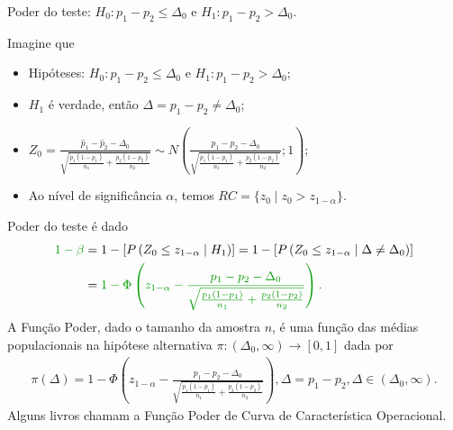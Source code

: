 \documentclass[9pt]{beamer}
\begin{document}
\begin{frame}{Poder do teste: $H_0:p_1 - p_2 \leq \Delta_0$ e $H_1: p_1 - p_2 > \Delta_0$.}

\footnotesize

Imagine que
\begin{itemize}
	\item Hipóteses: $H_0: p_1 - p_2 \leq \Delta_0$ e $H_1: p_1 -  p_2 > \Delta_0$;
	\item $H_1$ é verdade, então $\Delta = p_1-p_2 \neq \Delta_0$;
	\item $Z_0 = \frac{\hat{p}_1 - \hat{p}_2 - \Delta_0}{\sqrt{ 
			\frac{p_1(1-p_1)}{n_1} + \frac{p_2(1-p_2)}{n_2} }} \sim N\left( \frac{p_1 - p_2 - \Delta_0}{\sqrt{\frac{p_1(1-p_1)}{n_1} + \frac{p_2(1-p_2)}{n_2}}};1 \right)$;
	\item Ao nível de significância $\alpha$, temos $RC = \{ z_0 \mid z_0 > z_{1-\alpha}  \}$.
\end{itemize}
\vfill	

Poder do teste é dado
\begin{align*}
\textcolor{important}{1-\beta} &=1 - \left[P\left(  Z_0 \leq z_{1-\alpha} \mid H_1 \right)\right] = 1 - \left[P\left( Z_0 \leq z_{1-\alpha} \mid \Delta \neq \Delta_0 \right)\right]\\
&= \textcolor{important}{1 - \Phi\left( z_{1-\alpha} - \frac{p_1-p_2 - \Delta_0}{\sqrt{\frac{p_1(1-p_1)}{n_1} + \frac{p_2(1-p_2)}{n_2}}} \right).}
\end{align*}
A \textcolor{important}{Função Poder}, dado o tamanho da amostra $n$, é uma função das médias populacionais na hipótese alternativa  $\pi: (\Delta_0, \infty) \longrightarrow [0,1]$ dada por
\begin{align*}
\pi(\Delta) = 1 - \Phi\left( z_{1-\alpha} - \frac{p_1-p_2 - \Delta_0}{\sqrt{\frac{p_1(1-p_1)}{n_1} + \frac{p_2(1-p_2)}{n_2}}} \right), \Delta = p_1 - p_2, \Delta \in (\Delta_0, \infty).
\end{align*}
Alguns livros chamam a Função Poder de \textcolor{important}{Curva de Característica Operacional.}

\normalsize

\end{frame}
\end{document}
